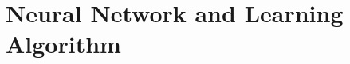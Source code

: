 \documentclass[a4paper]{book}
\begin{document}

\chapter{Neural Network and Learning Algorithm}







\end{document}
